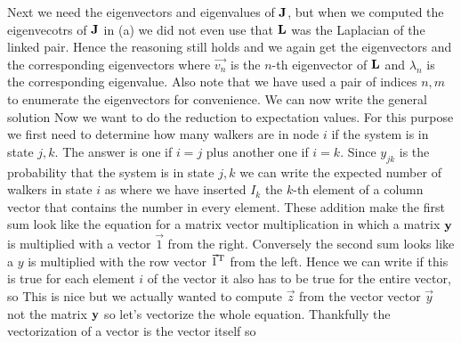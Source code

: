 Next we need the eigenvectors and eigenvalues of $\bf J$, but when we computed the eigenvecotrs of $\bf J$ in (a) we did not even use that $\bf L$ was the Laplacian of the linked pair. Hence the reasoning still holds and we again get the eigenvectors 
and the corresponding eigenvectors 
where $\vec{v_n}$ is the $n$-th eigenvector of $\bf L$ and $\lambda_n$ is the corresponding eigenvalue. Also note that we have used a pair of indices $n,m$ to enumerate the eigenvectors for convenience. We can now write the general solution 
Now we want to do the reduction to expectation values. For this purpose we first need to determine how many walkers are in node $i$ if the system is in state $j,k$. The answer is one if $i=j$ plus another one if $i=k$. Since $y_{jk}$ is the probability that the system is in state $j,k$  we can write the expected number of walkers in state $i$ as 
where we have inserted $I_k$ the $k$-th element of a column vector that contains the number in every element. These addition make the first sum look like the equation for a matrix vector multiplication in which a matrix ${\bf y}$ is multiplied with a vector $\vec{1}$ from the right. Conversely the second sum looks like a $y$ is multiplied with the row vector $\vec{1}^{\rm T}$ from the left. Hence we can write 
if this is true for each element $i$ of the vector it also has to be true for the entire vector, so 
This is nice but we actually wanted to compute $\vec{z}$ from the vector vector $\vec{y}$ not the matrix $\bf y$ so let's vectorize the whole equation. Thankfully the vectorization of a vector is the vector itself so 
